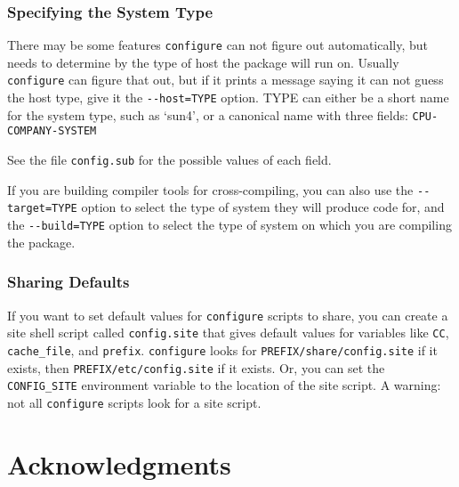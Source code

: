\begin{appendix}
\subsection*{Specifying the System Type}


   There may be some features \verb+configure+ can not figure out
automatically, but needs to determine by the type of host the package
will run on.  Usually \verb+configure+ can figure that out, but if it prints
a message saying it can not guess the host type, give it the
\verb+--host=TYPE+ option.  TYPE can either be a short name for the system
type, such as `sun4', or a canonical name with three fields: 
\verb+CPU-COMPANY-SYSTEM+

See the file \verb+config.sub+ for the possible values of each field. 
 
   If you are building compiler tools for cross-compiling, you can also
use the \verb+--target=TYPE+ option to select the type of system they will
produce code for, and the \verb+--build=TYPE+ option to select the type of
system on which you are compiling the package.

\subsection*{Sharing Defaults}
   If you want to set default values for \verb+configure+ scripts to share,
you can create a site shell script called \verb+config.site+ that gives
default values for variables like \verb+CC+,  \verb+cache_file+, and 
\verb+prefix+.
\verb+configure+ looks for \verb+PREFIX/share/config.site+ if it exists, then
\verb+PREFIX/etc/config.site+ if it exists.  Or, you can set the
\verb+CONFIG_SITE+ environment variable to the location of the site script.
A warning: not all \verb+configure+ scripts look for a site script.








\chapter*{Acknowledgments}

\end{appendix}

